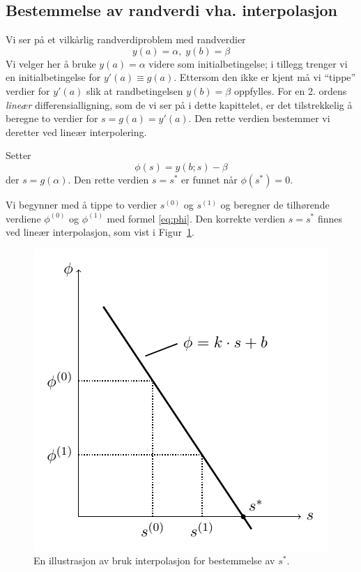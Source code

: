 \subsection{Bestemmelse av randverdi vha. interpolasjon} %
\label{sub:bestemme_}
Vi ser på et vilkårlig randverdiproblem med randverdier
\begin{equation}
  y(a) = \alpha, \; y(b) = \beta
\end{equation}
Vi velger her å bruke $y(a)=\alpha$ videre som initialbetingelse; i tillegg trenger vi en initialbetingelse for $y'(a)\equiv g(a)$. Ettersom den ikke er kjent må vi ``tippe'' verdier for $y'(a)$ slik at randbetingelsen $y(b)=\beta$ oppfylles. For en 2. ordens \emph{lineær} differensialligning, som de vi ser på i dette kapittelet, er det tilstrekkelig å beregne to verdier for $s=g(a)=y'(a)$. Den rette verdien bestemmer vi deretter ved lineær interpolering.

Setter
\begin{equation}
  \phi(s) = y(b;s) - \beta \label{eq:phi}
\end{equation}
der $s=g(\alpha)$. Den rette verdien $s=s^*$ er funnet når $\phi(s^*)=0$.

Vi begynner med å tippe to verdier $s^{(0)}$ og $s^{(1)}$ og beregner de tilhørende verdiene $\phi^{(0)}$ og $\phi^{(1)}$ med formel \eqref{eq:phi}. Den korrekte verdien $s=s^*$ finnes ved lineær interpolasjon, som vist i Figur~\ref{fig:interpolasjon}.

\begin{figure}[htbp]
  \centering
  \includegraphics[]{illustrations/interpolation.pdf}
  \caption{En illustrasjon av bruk interpolasjon for bestemmelse av $s^*$.}
  \label{fig:interpolasjon}
\end{figure}

